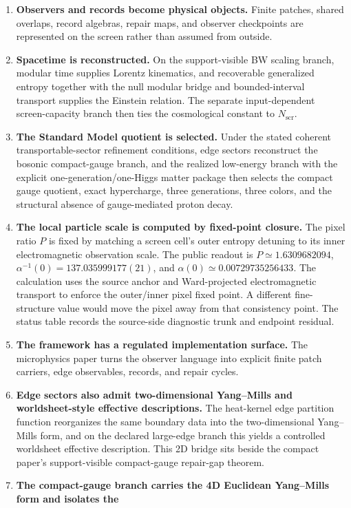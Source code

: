 \documentclass[11pt]{article}
\begin{document}
\begin{enumerate}[leftmargin=2em]
\item \textbf{Observers and records become physical objects.} Finite patches, shared overlaps,
record algebras, repair maps, and observer checkpoints are represented on the screen rather than
assumed from outside.
\item \textbf{Spacetime is reconstructed.} On the support-visible BW scaling branch, modular time
supplies Lorentz kinematics, and recoverable generalized entropy together with the null modular
bridge and bounded-interval transport supplies the Einstein relation. The separate input-dependent
screen-capacity branch then ties the cosmological constant to \(N_{\mathrm{scr}}\).
\item \textbf{The Standard Model quotient is selected.} Under the stated coherent transportable-sector
refinement conditions, edge sectors reconstruct the bosonic compact-gauge branch, and the realized low-energy branch
with the explicit one-generation/one-Higgs matter package then selects the compact gauge quotient, exact hypercharge,
three generations, three colors, and the structural absence of
gauge-mediated proton decay.
\item \textbf{The local particle scale is computed by fixed-point closure.} The pixel ratio \(P\) is
fixed by matching a screen cell's outer entropy detuning to its inner electromagnetic observation
scale. The public readout is \(P\simeq1.6309682094\),
\(\alpha^{-1}(0)=137.035999177(21)\), and
\(\alpha(0)\simeq0.00729735256433\). The calculation
uses the source anchor and Ward-projected electromagnetic transport to enforce
the outer/inner pixel fixed point. A different
fine-structure value would move the pixel away from that consistency point.
The status table
records the source-side diagnostic trunk and endpoint residual.
\item \textbf{The framework has a regulated implementation surface.} The microphysics paper turns
the observer language into explicit finite patch carriers, edge observables, records, and repair
cycles.
\item \textbf{Edge sectors also admit two-dimensional Yang--Mills and worldsheet-style effective descriptions.} The heat-kernel
edge partition function reorganizes the same boundary data into the two-dimensional
Yang--Mills form, and on the declared large-edge branch this yields a controlled worldsheet
effective description. This 2D bridge sits beside the compact paper's support-visible
compact-gauge repair-gap theorem.
\item \textbf{The compact-gauge branch carries the 4D Euclidean Yang--Mills form and isolates the
}
\end{enumerate}
\end{document}
